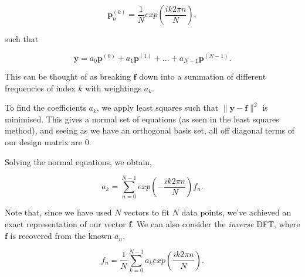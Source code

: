 \documentclass[12pt]{article}
\begin{document}
\vspace{2mm}

$$ \mathbf{p}_n^{(k)} = \frac{1}{N} exp\left(\frac{ik2\pi n}{N}\right),$$

\vspace{2mm}

%
%
%
%
%

such that

\vspace{2mm}

$$ \mathbf{y} = a_0 \mathbf{p}^{(0)} + a_1 \mathbf{p}^{(1)} + ... + a_{N-1} \mathbf{p}^{(N-1)}.$$

\vspace{4mm}

This can be thought of as breaking $\mathbf{f}$ down into a summation of different frequencies of index $k$ with weightings $a_k$.

\vspace{4mm}

To find the coefficients $a_k$, we apply least squares such that $\|\mathbf{y}-\mathbf{f}\|^2$ is minimised. This gives a normal set of equations (as seen in the least squares method), and seeing as we have an orthogonal basis set, all off diagonal terms of our design matrix are 0.

\vspace{4mm}

Solving the normal equations, we obtain,

\vspace{2mm}

$$ a_k = \sum_{n=0}^{N-1} exp\left( -\frac{ik2\pi n}{N} \right)f_n. $$

\vspace{4mm}

Note that, since we have used $N$ vectors to fit $N$ data points, we've achieved an exact representation of our vector $\mathbf{f}$. We can also consider the \textit{inverse} DFT, where $\mathbf{f}$ is recovered from the known $a_n$,

\vspace{2mm}

$$ f_n = \frac{1}{N} \sum_{k=0}^{N-1} a_k exp\left(\frac{ik2\pi n}{N} \right). $$
\end{document}
